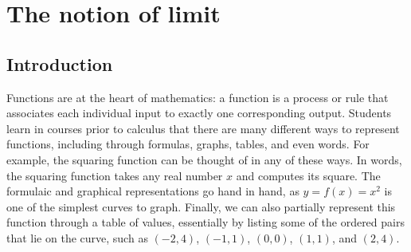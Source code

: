 \section{The notion of limit} \label{S:1.2.Limits}

\vspace*{-14 pt}

\subsection*{Introduction}

Functions are at the heart of mathematics: a function is a process or rule that associates each individual input to exactly one corresponding output.  Students learn in courses prior to calculus that there are many different ways to represent functions, including through formulas, graphs, tables, and even words.  For example, the squaring function can be thought of in any of these ways.  In words, the squaring function takes any real number $x$ and computes its square.  The formulaic and graphical representations go hand in hand, as $y = f(x) = x^2$ is one of the simplest curves to graph.  Finally, we can also partially represent this function through a table of values, essentially by listing some of the ordered pairs that lie on the curve, such as  $(-2,4)$, $(-1,1)$, $(0,0)$, $(1,1)$, and $(2,4)$.

